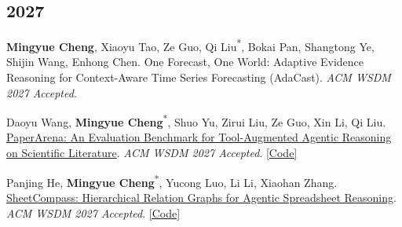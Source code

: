\documentclass[UTF8,fontset=fandol,scheme=plain,11pt,a4paper]{ctexart}
\newcommand{\pubentry}[1]{\item \begin{minipage}[t]{\linewidth}#1\end{minipage}}
\begin{document}
\subsection{2027}
\begin{publist}[start=1]
\pubentry{\textbf{Mingyue Cheng}, Xiaoyu Tao, Ze Guo, Qi Liu\textsuperscript{*}, Bokai Pan, Shangtong Ye, Shijin Wang, Enhong Chen. One Forecast, One World: Adaptive Evidence Reasoning for Context-Aware Time Series Forecasting (AdaCast). \emph{ACM WSDM 2027 Accepted}.}

\pubentry{Daoyu Wang, \textbf{Mingyue Cheng}\textsuperscript{*}, Shuo Yu, Zirui Liu, Ze Guo, Xin Li, Qi Liu. \href{https://arxiv.org/pdf/2510.10909}{PaperArena: An Evaluation Benchmark for Tool-Augmented Agentic Reasoning on Scientific Literature}. \emph{ACM WSDM 2027 Accepted}. \href{https://github.com/ustc-ai4science/PaperArena}{[Code]}}

\pubentry{Panjing He, \textbf{Mingyue Cheng}\textsuperscript{*}, Yucong Luo, Li Li, Xiaohan Zhang. \href{https://arxiv.org/pdf/2608.14452}{SheetCompass: Hierarchical Relation Graphs for Agentic Spreadsheet Reasoning}. \emph{ACM WSDM 2027 Accepted}. \href{https://github.com/PanJingHe/sheetcompass}{[Code]}}

\end{publist}

\end{document}

